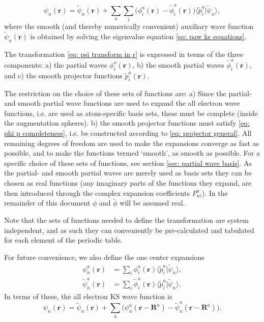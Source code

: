 \documentclass[a4paper]{article}
\newcommand{\f}[1]{\mathbf{#1}}
\newcommand{\s}[1]{\tilde{#1}}
\newcommand{\braket}[2]{\langle #1 | #2 \rangle}
\begin{document}
%
\begin{equation}\label{eq: psi transform in r}
\psi_n(\f{r}) = \s{\psi}_n(\f{r})+\sum_a\sum_i \big( \phi_i^a(\f{r})
- \s{\phi}_i^a(\f{r}) \big)\braket{\s{p}_i^a}{\s{\psi}_n},
\end{equation}
%
where the smooth (and thereby numerically convenient) auxiliary wave
function $\s{\psi}_n(\f{r})$ is obtained by solving the eigenvalue
equation \ref{eq: paw ks equations}.
\par The transformation \ref{eq: psi transform in r} is expressed in
terms of the three components: a) the partial waves $\phi_i^a(\f{r})$,
b) the smooth partial waves $\s{\phi}_i^a(\f{r})$, and c) the smooth
projector functions $\s{p}_i^a(\f{r})$.
\par The restriction on the choice of these sets of functions are: a)
Since the partial- and smooth partial wave functions are used to
expand the all electron wave functions, i.e. are used as atom-specific
basis sets, these must be complete (inside the augmentation spheres).
b) the smooth projector functions must satisfy \ref{eq: phi p
  completeness}, i.e. be constructed according to \ref{eq: projector
  general}.  All remaining degrees of freedom are used to make the
expansions converge as fast as possible, and to make the functions
termed `smooth', as smooth as possible. For a specific choice of these
sets of functions, see section \ref{sec: partial wave basis}. As the
partial- and smooth partial waves are merely used as basis sets they
can be chosen as real functions (any imaginary parts of the functions
they expand, are then introduced through the complex expansion
coefficients $P_{ni}^a$).  In the remainder of this document $\phi$
and $\s{\phi}$ will be assumed real.
\par Note that the sets of functions needed to define the transformation are
system independent, and as such they can conveniently be
pre-calculated and tabulated for each element of the periodic
table.
\par For future convenience, we also define the one center expansions
\begin{subequations}
\begin{align}
\psi_{n}^a(\f{r}) &= \sum_i \phi_i^a(\f{r})\braket{\s{p}_i^a}{\s{\psi}_n},\\
\s{\psi}_{n}^a(\f{r}) &= \sum_i
\s{\phi}_i^a(\f{r})\braket{\s{p}_i^a}{\s{\psi}_n}.
\end{align}
\end{subequations}
%
In terms of these, the all electron KS wave function is
%
\begin{equation}
\psi_n(\f{r})=\s{\psi}_n(\f{r})+\sum_{a} \big(
\psi_{n}^{a}(\f{r}-\f{R}^a) - \s{\psi}_{n}^a(\f{r}-\f{R}^a) \big).
\end{equation}
\end{document}

